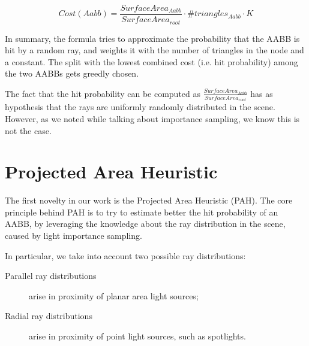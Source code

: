 \documentclass[11pt,a4paper,twocolumn]{article}
\begin{document}
$$
Cost(Aabb) = \frac{SurfaceArea_{Aabb}}{SurfaceArea_{root}} \cdot \#triangles_{Aabb} \cdot K
$$

In summary, the formula tries to approximate the probability that the AABB is hit by a random ray, and weights it with the number of triangles in the node and a constant. The split with the lowest combined cost (i.e. hit probability) among the two AABBs gets greedly chosen.

The fact that the hit probability can be computed as $\frac{SurfaceArea_{Aabb}}{SurfaceArea_{root}}$ has as hypothesis that the rays are uniformly randomly distributed in the scene. However, as we noted while talking about importance sampling, we know this is not the case.

\section{Projected Area Heuristic}
The first novelty in our work is the Projected Area Heuristic (PAH). The core principle behind PAH is to try to estimate better the hit probability of an AABB, by leveraging the knowledge about the ray distribution in the scene, caused by light importance sampling.

In particular, we take into account two possible ray distributions:
\begin{description}
    \item[Parallel ray distributions] arise in proximity of planar area light sources;
    \item[Radial ray distributions] arise in proximity of point light sources, such as spotlights. 
\end{description}
\end{document}
